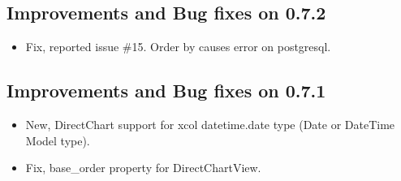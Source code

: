 \documentclass[letterpaper,10pt,english]{sphinxmanual}
\begin{document}
\subsection{Improvements and Bug fixes on 0.7.2}
\label{versions:improvements-and-bug-fixes-on-0-7-2}\begin{itemize}
\item {} 
Fix, reported issue \#15. Order by causes error on postgresql.

\end{itemize}


\subsection{Improvements and Bug fixes on 0.7.1}
\label{versions:improvements-and-bug-fixes-on-0-7-1}\begin{itemize}
\item {} 
New, DirectChart support for xcol datetime.date type (Date or DateTime Model type).

\item {} 
Fix, base\_order property for DirectChartView.

\end{itemize}
\end{document}
